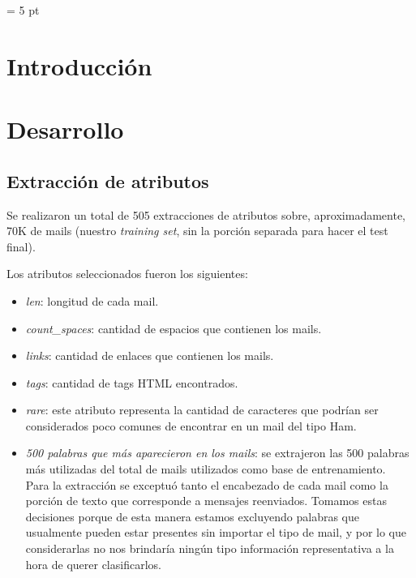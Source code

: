 \documentclass[a4paper]{article}
\begin{document}
\parskip = 5 pt
\thispagestyle{empty}

\maketitle




\newpage
\tableofcontents
\thispagestyle{empty}

\newpage
\section{Introducción}





\newpage

\section{Desarrollo}

\subsection{Extracción de atributos}

Se realizaron un total de 505 extracciones de atributos sobre, aproximadamente, 70K de mails (nuestro \textit{training set}, sin la porción separada para hacer el test final).

Los atributos seleccionados fueron los siguientes:
\begin{itemize}
\item \textit{len}: longitud de cada mail.
\item \textit{count\_spaces}: cantidad de espacios que contienen los mails.
\item \textit{links}: cantidad de enlaces que contienen los mails.
\item \textit{tags}: cantidad de tags HTML encontrados.
\item \textit{rare}: este atributo representa la cantidad de caracteres que podrían ser considerados poco comunes de encontrar en un mail del tipo Ham.
\item \textit{500 palabras que más aparecieron en los mails}: se extrajeron las 500 palabras más utilizadas del total de mails utilizados como base de entrenamiento. \\

Para la extracción se exceptuó tanto el encabezado de cada mail como la porción de texto que corresponde a mensajes reenviados. Tomamos estas decisiones porque de esta manera estamos excluyendo palabras que usualmente pueden estar presentes sin importar el tipo de mail, y por lo que considerarlas no nos brindaría ningún tipo información representativa a la hora de querer clasificarlos.     
\end{itemize}
\end{document}
